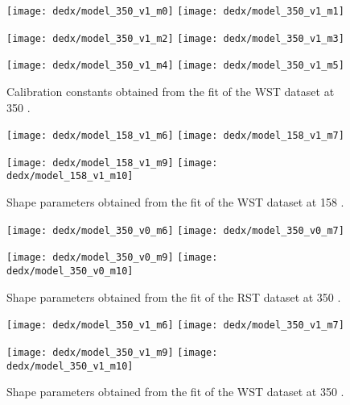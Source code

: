 \begin{figure}
  \centering
  \texttt{[image: dedx/model\_350\_v1\_m0]}
  \texttt{[image: dedx/model\_350\_v1\_m1]}

  \texttt{[image: dedx/model\_350\_v1\_m2]}
  \texttt{[image: dedx/model\_350\_v1\_m3]}

  \texttt{[image: dedx/model\_350\_v1\_m4]}
  \texttt{[image: dedx/model\_350\_v1\_m5]}
  \caption{Calibration constants obtained from the fit of the WST dataset at 350 \GeVc.}
  \label{fig:hadron:dedx:fit:cal350w}
\end{figure}

\clearpage

\begin{figure}
  \centering
  \texttt{[image: dedx/model\_158\_v1\_m6]}
  \texttt{[image: dedx/model\_158\_v1\_m7]}

  \texttt{[image: dedx/model\_158\_v1\_m9]}
  \texttt{[image: dedx/model\_158\_v1\_m10]}
  \caption{Shape parameters obtained from the fit of the WST dataset at 158 \GeVc.}
  \label{fig:hadron:dedx:fit:shape158w}
\end{figure}

\begin{figure}
  \centering
  \texttt{[image: dedx/model\_350\_v0\_m6]}
  \texttt{[image: dedx/model\_350\_v0\_m7]}

  \texttt{[image: dedx/model\_350\_v0\_m9]}
  \texttt{[image: dedx/model\_350\_v0\_m10]}
  \caption{Shape parameters obtained from the fit of the RST dataset at 350 \GeVc.}
  \label{fig:hadron:dedx:fit:shape350r}
\end{figure}

\begin{figure}
  \centering
  \texttt{[image: dedx/model\_350\_v1\_m6]}
  \texttt{[image: dedx/model\_350\_v1\_m7]}

  \texttt{[image: dedx/model\_350\_v1\_m9]}
  \texttt{[image: dedx/model\_350\_v1\_m10]}
  \caption{Shape parameters obtained from the fit of the WST dataset at 350 \GeVc.}
  \label{fig:hadron:dedx:fit:shape350w}
\end{figure}

